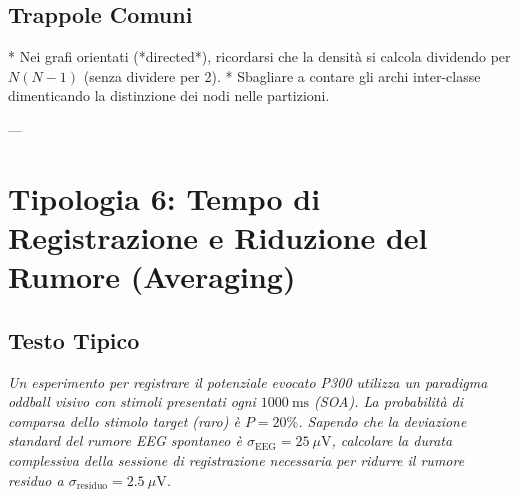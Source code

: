 \documentclass[10pt, letterpaper]{report}
\begin{document}
\subsection*{Trappole Comuni}
* Nei grafi orientati (*directed*), ricordarsi che la densità si calcola dividendo per $N(N-1)$ (senza dividere per 2).
* Sbagliare a contare gli archi inter-classe dimenticando la distinzione dei nodi nelle partizioni.

---

\section{Tipologia 6: Tempo di Registrazione e Riduzione del Rumore (Averaging)}

\subsection*{Testo Tipico}
\emph{Un esperimento per registrare il potenziale evocato P300 utilizza un paradigma oddball visivo con stimoli presentati ogni $1000\ \text{ms}$ (SOA).
La probabilità di comparsa dello stimolo target (raro) è $P = 20\%$.
Sapendo che la deviazione standard del rumore EEG spontaneo è $\sigma_{\text{EEG}} = 25\ \mu\text{V}$, calcolare la durata complessiva della sessione di registrazione necessaria per ridurre il rumore residuo a $\sigma_{\text{residuo}} = 2.5\ \mu\text{V}$.}
\end{document}
